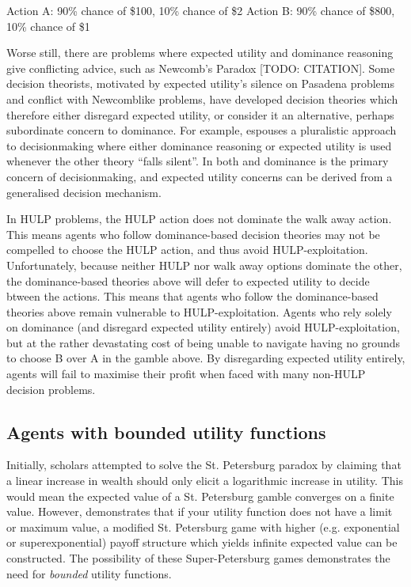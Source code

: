 \documentclass{article}
\begin{document}
\begin{center}
Action A: 90\% chance of \$100, 10\% chance of \$2
Action B: 90\% chance of \$800, 10\% chance of \$1
\end{center}

Worse still, there are problems where expected utility and dominance reasoning give conflicting advice, such as Newcomb's Paradox [TODO: CITATION]. Some decision theorists, motivated by expected utility's silence on Pasadena problems and conflict with Newcomblike problems, have developed decision theories which therefore either disregard expected utility, or consider it an alternative, perhaps subordinate concern to dominance. For example, \citep{colyvan2006no} espouses a pluralistic approach to decisionmaking where either dominance reasoning or expected utility is used whenever the other theory ``falls silent''. In both \citep{easwaran2009dominance} and \citep{colyvan2008relative} dominance is the primary concern of decisionmaking, and expected utility concerns can be derived from a generalised decision mechanism.

In HULP problems, the HULP action does not dominate the walk away action. This means agents who follow dominance-based decision theories may not be compelled to choose the HULP action, and thus avoid HULP-exploitation. Unfortunately, because neither HULP nor walk away options dominate the other, the dominance-based theories above will defer to expected utility to decide btween the actions. This means that agents who follow the dominance-based theories above remain vulnerable to HULP-exploitation. Agents who rely solely on dominance (and disregard expected utility entirely) avoid HULP-exploitation, but at the rather devastating cost of being unable to navigate having no grounds to choose B over A in the gamble above. By disregarding expected utility entirely, agents will fail to maximise their profit when faced with many non-HULP decision problems.

\subsection{Agents with bounded utility functions}

Initially, scholars attempted to solve the St. Petersburg paradox by claiming that a linear increase in wealth should only elicit a logarithmic increase in utility. This would mean the expected value of a St. Petersburg gamble converges on a finite value. However, \citep{menger1934petersburg} demonstrates that if your utility function does not have a limit or maximum value, a modified St. Petersburg game with higher (e.g. exponential or superexponential) payoff structure which yields infinite expected value can be constructed. The possibility of these Super-Petersburg games demonstrates the need for \textit{bounded} utility functions.
\end{document}
